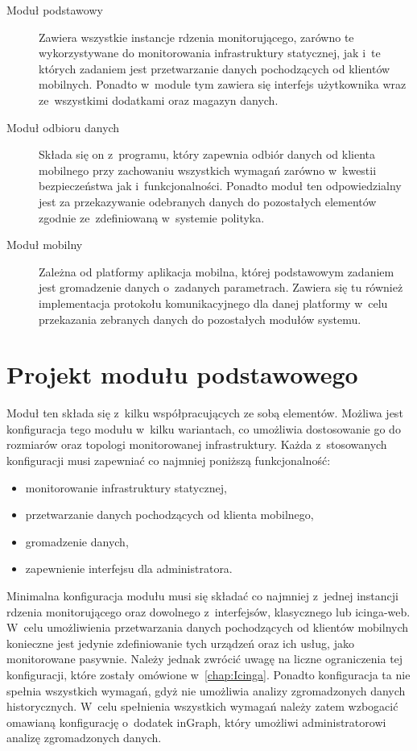 \begin{description}
\item[Moduł podstawowy] Zawiera wszystkie instancje rdzenia
  monitorującego, zarówno te wykorzystywane do monitorowania
  infrastruktury statycznej, jak i~te których zadaniem jest
  przetwarzanie danych pochodzących od klientów mobilnych. Ponadto
  w~module tym zawiera się interfejs użytkownika wraz ze~wszystkimi
  dodatkami oraz magazyn danych.

\item[Moduł odbioru danych] Składa się on z~programu, który zapewnia
  odbiór danych od klienta mobilnego przy zachowaniu wszystkich
  wymagań zarówno w~kwestii bezpieczeństwa jak
  i~funkcjonalności. Ponadto moduł ten odpowiedzialny jest za
  przekazywanie odebranych danych do pozostałych elementów zgodnie
  ze~zdefiniowaną w~systemie polityka.

\item[Moduł mobilny] Zależna od platformy aplikacja mobilna, której
  podstawowym zadaniem jest gromadzenie danych o~zadanych
  parametrach. Zawiera się tu również implementacja protokołu
  komunikacyjnego dla danej platformy w~celu przekazania zebranych
  danych do pozostałych modułów systemu.
\end{description}

\section[Projekt modułu podstawowego][Projekt modułu podstawowego]{Projekt modułu podstawowego}

Moduł ten składa się z~kilku współpracujących ze sobą
elementów. Możliwa jest konfiguracja tego modułu w~kilku wariantach,
co umożliwia dostosowanie go do rozmiarów oraz topologi monitorowanej
infrastruktury. Każda z~stosowanych konfiguracji musi zapewniać
co najmniej poniższą funkcjonalność:

\begin{itemize}
\item monitorowanie infrastruktury statycznej,
\item przetwarzanie danych pochodzących od klienta mobilnego,
\item gromadzenie danych,
\item zapewnienie interfejsu dla administratora.
\end{itemize}

Minimalna konfiguracja modułu musi się składać co najmniej z~jednej
instancji rdzenia monitorującego oraz dowolnego z~interfejsów,
klasycznego lub icinga-web. W~celu umożliwienia przetwarzania danych
pochodzących od klientów mobilnych konieczne jest jedynie
zdefiniowanie tych urządzeń oraz ich usług, jako monitorowane
pasywnie. Należy jednak zwrócić uwagę na liczne ograniczenia tej
konfiguracji, które zostały omówione w~\ref{chap:Icinga}. Ponadto
konfiguracja ta nie spełnia wszystkich wymagań, gdyż nie umożliwia
analizy zgromadzonych danych historycznych. W~celu spełnienia
wszystkich wymagań należy zatem wzbogacić omawianą konfigurację
o~dodatek inGraph, który umożliwi administratorowi analizę
zgromadzonych danych.


